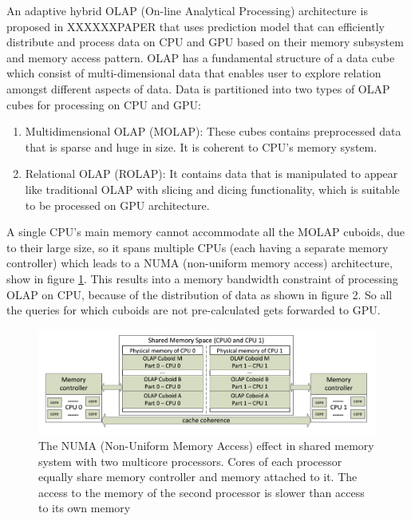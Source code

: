 \documentclass[runningheads,a4paper]{llncs}
\begin{document}
{An adaptive hybrid OLAP (On-line Analytical Processing) architecture is proposed in XXXXXXPAPER that uses prediction model that can efficiently distribute and process data on CPU and GPU based on their memory subsystem and memory access pattern. OLAP has a fundamental structure of a data cube which consist of multi-dimensional data that enables user to explore relation amongst different aspects of data. Data is partitioned into two types of OLAP cubes for processing on CPU and GPU:\\
\begin{enumerate}
	\item Multidimensional OLAP (MOLAP): These cubes contains preprocessed data that is sparse and huge in size. It is coherent to CPU's memory system.
	\item Relational OLAP (ROLAP): It contains data that is manipulated to appear like traditional OLAP with slicing and dicing functionality, which is suitable to be processed on GPU architecture.
\end{enumerate}

 A single CPU's main memory cannot accommodate all the MOLAP cuboids, due to their large size, so it spans multiple CPUs (each having a separate memory controller) which leads to a NUMA (non-uniform memory access) architecture, show in figure \ref{fig:nume_something}. This results into a memory bandwidth constraint of processing OLAP on CPU, because of the distribution of data as shown in figure 2. So all the queries for which cuboids are not pre-calculated gets forwarded to GPU.
 
 \begin{figure}[!htb]
 	\includegraphics[scale=0.7]{./images/krunal4}
 	\centering
 	\caption{The NUMA (Non-Uniform Memory Access) effect in shared memory system with two multicore processors. Cores of each processor equally share memory controller and memory attached to it. The access to the memory of the second processor is slower than access to its own memory }
 	\label{fig:nume_something}
 \end{figure}

}
\end{document}
